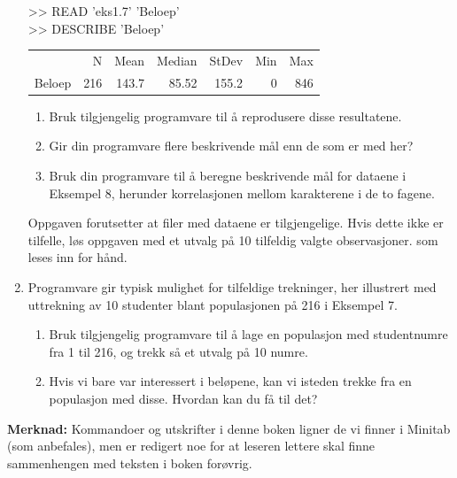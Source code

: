 \begin{enumerate}
\begin{center}
{\begin{minipage}{9cm}
 >> READ 'eks1.7' 'Beloep'\\
 >> DESCRIBE 'Beloep' \\
\begin{tabular}{lrrrrrr}
              &      N &    Mean &  Median & StDev &   Min & Max \\
 Beloep       &    216 &   143.7 &   85.52 & 155.2 &     0 & 846 \\
 \end{tabular}
\end{minipage}} \end{center}
\begin{enumerate}
\item
Bruk tilgjengelig programvare til å reprodusere disse resultatene.
\item
Gir din programvare flere beskrivende mål enn de som er med her?
\item
Bruk din programvare til å beregne beskrivende mål for dataene
i Eksempel 8, herunder korrelasjonen mellom karakterene i de to fagene.
\end{enumerate}
Oppgaven forutsetter at filer med dataene er tilgjengelige. Hvis dette ikke er
tilfelle, løs oppgaven med et utvalg på 10 tilfeldig valgte observasjoner.
som leses inn for hånd.


\item
Programvare gir typisk mulighet for tilfeldige trekninger, her illustrert med
uttrekning av 10 studenter blant populasjonen på 216 i Eksempel 7.
\begin{center}  \end{center}
\begin{enumerate}
\item
Bruk tilgjengelig programvare til å lage en populasjon med studentnumre fra
1 til 216, og trekk så et utvalg på 10 numre.
\item
Hvis vi bare var interessert i beløpene, kan vi isteden trekke fra en
populasjon med disse. Hvordan kan du få til det?
\end{enumerate}

\end{enumerate}

\noindent
{\bf Merknad:} Kommandoer og utskrifter i denne boken ligner de vi finner i
Minitab (som anbefales), men er redigert noe for at leseren lettere skal finne
sammenhengen med teksten i boken forøvrig.

\normalsize

             
   
